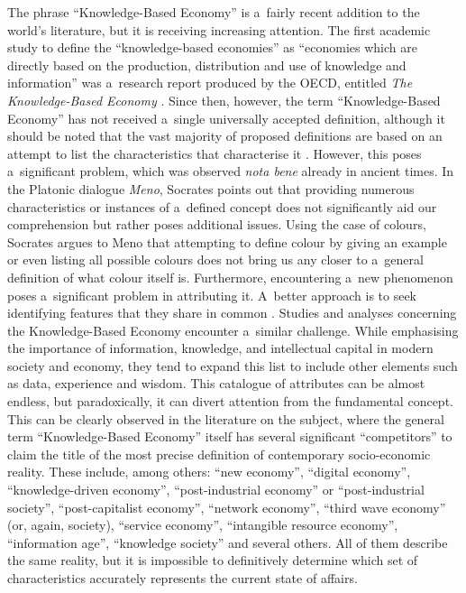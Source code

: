 The phrase ``Knowledge-Based Economy'' is a~fairly recent addition to the world's literature, but it is receiving increasing attention. The first academic study to define the ``knowledge-based economies'' as ``economies which are directly based on the production, distribution and use of knowledge and information'' was a~research report produced by the OECD, entitled \textit{The Knowledge-Based Economy} 
\parencite[][p.7]{oecd_knowledge-based_1996}. %
 Since then, however, the term ``Knowledge-Based Economy'' has not received a~single universally accepted definition, although it should be noted that the vast majority of proposed definitions are based on an attempt to list the characteristics that characterise it 
\parencite[][p.80]{kuklinski_wiedza_2001}. %
 However, this poses a~significant problem, which was observed \textit{nota bene} already in ancient times. In the Platonic dialogue \textit{Meno}, Socrates points out that providing numerous characteristics or instances of a~defined concept does not significantly aid our comprehension but rather poses additional issues. Using the case of colours, Socrates argues to Meno that attempting to define colour by giving an example or even listing all possible colours does not bring us any closer to a~general definition of what colour itself is. Furthermore, encountering a~new phenomenon poses a~significant problem in attributing it. A~better approach is to seek identifying features that they share in common 
\parencite[][]{}. %
 Studies and analyses concerning the Knowledge-Based Economy encounter a~similar challenge. While emphasising the importance of information, knowledge, and intellectual capital in modern society and economy, they tend to expand this list to include other elements such as data, experience and wisdom. This catalogue of attributes can be almost endless, but paradoxically, it can divert attention from the fundamental concept. This can be clearly observed in the literature on the subject, where the general term ``Knowledge-Based Economy'' itself has several significant ``competitors'' to claim the title of the most precise definition of contemporary socio-economic reality. These include, among others: ``new economy'', ``digital economy'', ``knowledge-driven economy'', ``post-industrial economy'' or ``post-industrial society'', ``post-capitalist economy'', ``network economy'', ``third wave economy'' (or, again, society), ``service economy'', ``intangible resource economy'', ``information age'', ``knowledge society'' and several others. All of them describe the same reality, but it is impossible to definitively determine which set of characteristics accurately represents the current state of affairs.



